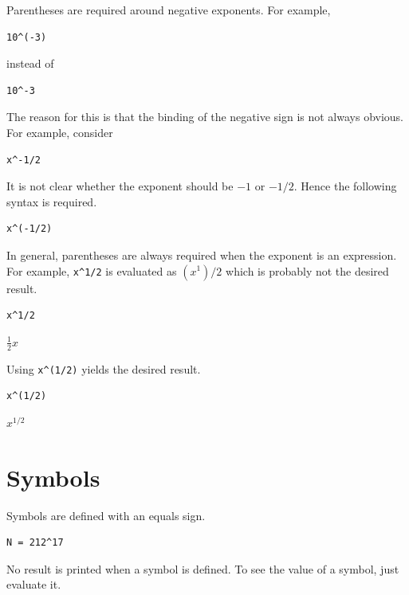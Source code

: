 \documentclass[12pt]{article}
\begin{document}
Parentheses are required around negative exponents.
For example,

{\color{blue}
\begin{verbatim}
10^(-3)
\end{verbatim}
}

instead of

{\color{blue}
\begin{verbatim}
10^-3
\end{verbatim}
}

The reason for this is that the binding of the negative sign is not always obvious.
For example, consider

{\color{blue}
\begin{verbatim}
x^-1/2
\end{verbatim}
}

It is not clear whether the exponent should be $-1$ or $-1/2$.
Hence the following syntax is required.

{\color{blue}
\begin{verbatim}
x^(-1/2)
\end{verbatim}
}

In general, parentheses are always required when the exponent
is an expression.
For example, \verb$x^1/2$ is evaluated as $(x^1)/2$ which
is probably not the desired result.

{\color{blue}
\begin{verbatim}
x^1/2
\end{verbatim}
}

$\displaystyle \tfrac{1}{2}x$

\bigskip

Using \verb$x^(1/2)$ yields the desired result.

{\color{blue}
\begin{verbatim}
x^(1/2)
\end{verbatim}
}

$\displaystyle x^{1/2}$

\newpage

\section{Symbols}

Symbols are defined with an equals sign.

{\color{blue}
\begin{verbatim}
N = 212^17
\end{verbatim}
}

No result is printed when a symbol is defined.
To see the value of a symbol, just evaluate it.
\end{document}
